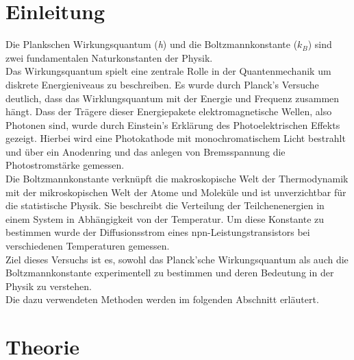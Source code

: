 \documentclass[a4paper,10pt,twocolumn]{scrartcl} %
\begin{document}
\section{Einleitung}
	Die Plankschen Wirkungsquantum (\textit{h}) und die Boltzmannkonstante (\textit{$k_B$}) sind zwei fundamentalen Naturkonstanten der Physik.\\
	Das Wirkungsquantum spielt eine zentrale Rolle in der Quantenmechanik um diskrete Energieniveaus zu beschreiben. Es wurde durch Planck's Versuche deutlich,
	dass das Wirklungsquantum mit der Energie und Frequenz zusammen hängt. Dass der Trägere dieser Energiepakete elektromagnetische Wellen, also Photonen sind, 
	wurde durch Einstein's Erklärung des Photoelektrischen Effekts gezeigt. 
	Hierbei wird eine Photokathode mit monochromatischem Licht bestrahlt und über ein Anodenring und das anlegen von Bremsspannung die Photostromstärke gemessen. \\
	Die Boltzmannkonstante verknüpft die makroskopische Welt der Thermodynamik mit der mikroskopischen Welt der Atome und Moleküle und ist unverzichtbar für die
	statistische Physik. Sie beschreibt die Verteilung der Teilchenenergien in einem System in Abhängigkeit von der Temperatur. 
	Um diese Konstante zu bestimmen wurde der Diffusionsstrom eines npn-Leistungstransistors bei verschiedenen Temperaturen gemessen.\\
	Ziel dieses Versuchs ist es, sowohl das Planck'sche Wirkungsquantum als auch die Boltzmannkonstante experimentell zu bestimmen und deren Bedeutung in der Physik zu verstehen.\\
	Die dazu verwendeten Methoden werden im folgenden Abschnitt erläutert.
\section{Theorie}
\end{document}
